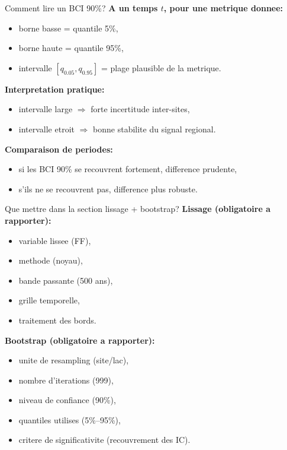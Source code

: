 \documentclass[aspectratio=169,11pt]{beamer}
\begin{document}
\begin{frame}{Comment lire un BCI 90\%?}
\textbf{A un temps \(t\), pour une metrique donnee:}
\begin{itemize}
  \item borne basse = quantile 5\%,
  \item borne haute = quantile 95\%,
  \item intervalle \([q_{0.05}, q_{0.95}]\) = plage plausible de la metrique.
\end{itemize}

\textbf{Interpretation pratique:}
\begin{itemize}
  \item intervalle large \(\Rightarrow\) forte incertitude inter-sites,
  \item intervalle etroit \(\Rightarrow\) bonne stabilite du signal regional.
\end{itemize}

\textbf{Comparaison de periodes:}
\begin{itemize}
  \item si les BCI 90\% se recouvrent fortement, difference prudente,
  \item s'ils ne se recouvrent pas, difference plus robuste.
\end{itemize}
\end{frame}

\begin{frame}{Que mettre dans la section lissage + bootstrap?}
\textbf{Lissage (obligatoire a rapporter):}
\begin{itemize}
  \item variable lissee (FF),
  \item methode (noyau),
  \item bande passante (500 ans),
  \item grille temporelle,
  \item traitement des bords.
\end{itemize}

\textbf{Bootstrap (obligatoire a rapporter):}
\begin{itemize}
  \item unite de resampling (site/lac),
  \item nombre d'iterations (999),
  \item niveau de confiance (90\%),
  \item quantiles utilises (5\%--95\%),
  \item critere de significativite (recouvrement des IC).
\end{itemize}
\end{frame}
\end{document}
